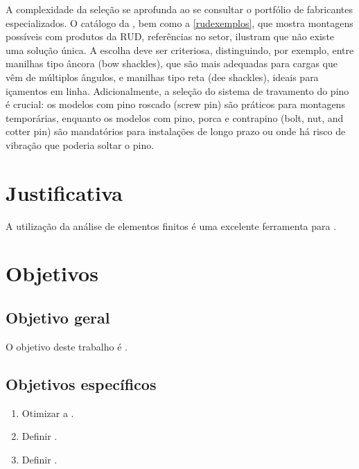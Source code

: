 A complexidade da seleção se aprofunda ao se consultar o portfólio de fabricantes especializados. O catálogo da \textcite{Crosby}, bem como a  \ref{rudexemplos}, que mostra montagens possíveis com produtos da RUD, referências no setor, ilustram que não existe uma solução única. A escolha deve ser criteriosa, distinguindo, por exemplo, entre manilhas tipo âncora (bow shackles), que são mais adequadas para cargas que vêm de múltiplos ângulos, e manilhas tipo reta (dee shackles), ideais para içamentos em linha. Adicionalmente, a seleção do sistema de travamento do pino é crucial: os modelos com pino roscado (screw pin) são práticos para montagens temporárias, enquanto os modelos com pino, porca e contrapino (bolt, nut, and cotter pin) são mandatórios para instalações de longo prazo ou onde há risco de vibração que poderia soltar o pino.



\section{Justificativa}

A utilização da análise de elementos finitos é uma excelente ferramenta para .

\section{Objetivos}

\subsection{Objetivo geral}

O objetivo deste trabalho é .  


\subsection{Objetivos específicos}
\begin{enumerate}

    \item Otimizar a .

    \item Definir .

    \item Definir .
    
\end{enumerate}